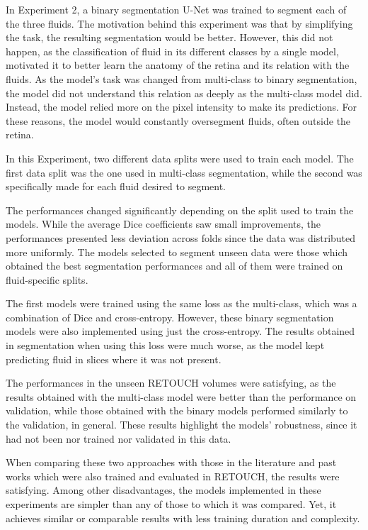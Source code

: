 In Experiment 2, a binary segmentation U-Net was trained to segment each of the three fluids. The motivation behind this experiment was that by simplifying the task, the resulting segmentation would be better. However, this did not happen, as the classification of fluid in its different classes by a single model, motivated it to better learn the anatomy of the retina and its relation with the fluids.  As the model's task was changed from multi-class to binary segmentation, the model did not understand this relation as deeply as the multi-class model did. Instead, the model relied more on the pixel intensity to make its predictions. For these reasons, the model would constantly oversegment fluids, often outside the retina.
\par
In this Experiment, two different data splits were used to train each model. The first data split was the one used in multi-class segmentation, while the second was specifically made for each fluid desired to segment.
\par
The performances changed significantly depending on the split used to train the models. While the average Dice coefficients saw small improvements, the performances presented less deviation across folds since the data was distributed more uniformly. The models selected to segment unseen data were those which obtained the best segmentation performances and all of them were trained on fluid-specific splits.
\par
The first models were trained using the same loss as the multi-class, which was a combination of Dice and cross-entropy. However, these binary segmentation models were also implemented using just the cross-entropy. The results obtained in segmentation when using this loss were much worse, as the model kept predicting fluid in slices where it was not present.
\par
The performances in the unseen RETOUCH volumes were satisfying, as the results obtained with the multi-class model were better than the performance on validation, while those obtained with the binary models performed similarly to the validation, in general. These results highlight the models' robustness, since it had not been nor trained nor validated in this data.
\par
When comparing these two approaches with those in the literature and past works which were also trained and evaluated in RETOUCH, the results were satisfying. Among other disadvantages, the models implemented in these experiments are simpler than any of those to which it was compared. Yet, it achieves similar or comparable results with less training duration and complexity.
